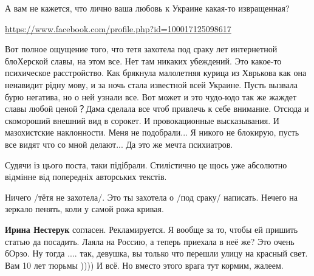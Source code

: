 \begin{itemize}
\begin{itemize}
А вам не кажется, что лично ваша любовь к Украине какая-то извращенная?
\end{itemize}

\url{https://www.facebook.com/profile.php?id=100017125098617}\par
 

Вот полное ощущение того, что тетя захотела под сраку лет интернетной
блоХерской славы, на этом все. Нет там никаких убеждений. Это какое-то
психическое расстройство. Как брякнула малолетняя курица из Хврькова как она
ненавидит рідну мову, и за ночь стала известной всей Украине. Пусть вызвала
бурю негатива, но о ней узнали все. Вот может и это чудо-юдо так же жаждет
славы любой ценой？Дама сделала все чтоб привлечь к себе внимание. Отсюда и
скомороший внешний вид в сорокет. И провокационные высказывания. И мазохистские
наклонности. Меня не подобрали... Я никого не блокирую, пусть все видят что со
мной делают... Да это же мечта психиатров.

\begin{itemize}
 
Судячи із цього поста, таки підібрали. Стилістично це щось уже абсолютно відмінне від попередніх авторських текстів.

 
Ничего /тётя не захотела/.
Это ты захотела о /под сраку/ написать.
Нечего на зеркало пенять, коли у самой рожа кривая.

 
\textbf{Ирина Нестерук} согласен. Рекламируется. Я вообще за то, чтобы ей
пришить статью да посадить. Лаяла на Россию, а теперь приехала в неё же? Это
очень бОрзо. Ну тогда .... так, девушка, вы только что перешли улицу на красный
свет. Вам 10 лет тюрьмы )))) И всё. Но вместо этого врага тут кормим, жалеем.


\end{itemize}
\end{itemize}
